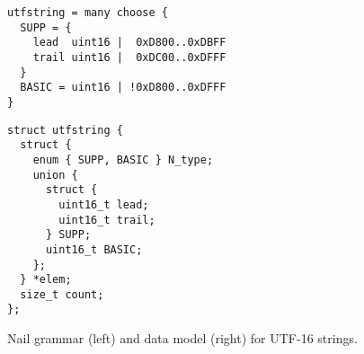 \begin{figure*}
\begin{minipage}{\columnwidth}
\begin{verbatim}
utfstring = many choose {
  SUPP = {
    lead  uint16 |  0xD800..0xDBFF
    trail uint16 |  0xDC00..0xDFFF
  }
  BASIC = uint16 | !0xD800..0xDFFF
}
\end{verbatim}
\end{minipage}
\hspace{\columnsep}
\begin{minipage}{\columnwidth}
\begin{verbatim}
struct utfstring {
  struct {
    enum { SUPP, BASIC } N_type;
    union {
      struct {
        uint16_t lead;
        uint16_t trail;
      } SUPP;
      uint16_t BASIC;
    };
  } *elem;
  size_t count;
};
\end{verbatim}
\end{minipage}
\caption{Nail grammar (left) and data model (right) for UTF-16 strings.}
\label{fig:utf16}
\end{figure*}

